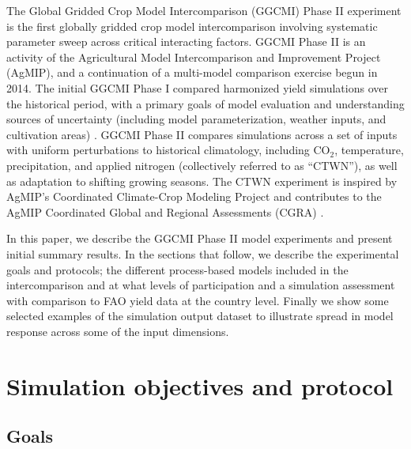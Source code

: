 \documentclass[gmd, manuscript]{copernicus} %
\begin{document}
The Global Gridded Crop Model Intercomparison (GGCMI) Phase II experiment is the first globally gridded crop model intercomparison involving systematic parameter sweep across critical interacting factors.
GGCMI Phase II is an activity of the Agricultural Model Intercomparison and Improvement Project (AgMIP), 
and a continuation of a multi-model comparison exercise begun in 2014. 
The initial GGCMI Phase I compared harmonized yield simulations over the historical period, with a primary goals of model evaluation and understanding sources of uncertainty (including model parameterization, weather inputs, and cultivation areas) \citep{Elliott2015, muller_global_2017, folberth2016, porwollik_spatial_2016}. 
GGCMI Phase II compares simulations across a set of inputs with uniform perturbations to historical climatology,  
including CO$_2$, temperature, precipitation, and applied nitrogen (collectively referred to as ``CTWN''), as well as adaptation to shifting growing seasons. 
The CTWN experiment is inspired by AgMIP's Coordinated Climate-Crop Modeling Project \citep[C3MP][]{ruane2014,mcdermid2015agmip} and contributes to the AgMIP Coordinated Global and Regional Assessments (CGRA) \citep{ruane2018, rosenzweig2018}. 

In this paper, we describe the GGCMI Phase II model experiments and present initial summary results.
In the sections that follow, we describe the experimental goals and protocols; the different process-based models included in the intercomparison and at what levels of participation and a simulation assessment with comparison to FAO yield data at the country level. 
Finally we show some selected examples of the simulation output dataset to illustrate spread in model response across some of the input dimensions.

\section{Simulation objectives and protocol}
\label{S:2}
\subsection{Goals}
\end{document}

